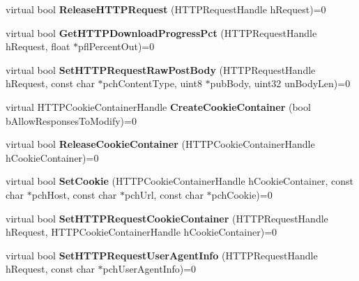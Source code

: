 \begin{DoxyCompactItemize}
\item 
\hypertarget{classISteamHTTP_ac533533e2d27065ba2f62f6e8252078a}{}virtual bool {\bfseries Release\+H\+T\+T\+P\+Request} (H\+T\+T\+P\+Request\+Handle h\+Request)=0\label{classISteamHTTP_ac533533e2d27065ba2f62f6e8252078a}

\item 
\hypertarget{classISteamHTTP_a243d9d8761e3bdbfbfc83b1d2f447800}{}virtual bool {\bfseries Get\+H\+T\+T\+P\+Download\+Progress\+Pct} (H\+T\+T\+P\+Request\+Handle h\+Request, float $\ast$pfl\+Percent\+Out)=0\label{classISteamHTTP_a243d9d8761e3bdbfbfc83b1d2f447800}

\item 
\hypertarget{classISteamHTTP_a00db00fdf21a17f5ca65019d219834a0}{}virtual bool {\bfseries Set\+H\+T\+T\+P\+Request\+Raw\+Post\+Body} (H\+T\+T\+P\+Request\+Handle h\+Request, const char $\ast$pch\+Content\+Type, uint8 $\ast$pub\+Body, uint32 un\+Body\+Len)=0\label{classISteamHTTP_a00db00fdf21a17f5ca65019d219834a0}

\item 
\hypertarget{classISteamHTTP_ac18346553863fd8c7a448ee88caff3ff}{}virtual H\+T\+T\+P\+Cookie\+Container\+Handle {\bfseries Create\+Cookie\+Container} (bool b\+Allow\+Responses\+To\+Modify)=0\label{classISteamHTTP_ac18346553863fd8c7a448ee88caff3ff}

\item 
\hypertarget{classISteamHTTP_a4fddec56eeaa93b238698a7ecb02b2a9}{}virtual bool {\bfseries Release\+Cookie\+Container} (H\+T\+T\+P\+Cookie\+Container\+Handle h\+Cookie\+Container)=0\label{classISteamHTTP_a4fddec56eeaa93b238698a7ecb02b2a9}

\item 
\hypertarget{classISteamHTTP_a98107c488259499b563febac14f1d6f5}{}virtual bool {\bfseries Set\+Cookie} (H\+T\+T\+P\+Cookie\+Container\+Handle h\+Cookie\+Container, const char $\ast$pch\+Host, const char $\ast$pch\+Url, const char $\ast$pch\+Cookie)=0\label{classISteamHTTP_a98107c488259499b563febac14f1d6f5}

\item 
\hypertarget{classISteamHTTP_a94e927f0b7f06fa79246c6443d5b3629}{}virtual bool {\bfseries Set\+H\+T\+T\+P\+Request\+Cookie\+Container} (H\+T\+T\+P\+Request\+Handle h\+Request, H\+T\+T\+P\+Cookie\+Container\+Handle h\+Cookie\+Container)=0\label{classISteamHTTP_a94e927f0b7f06fa79246c6443d5b3629}

\item 
\hypertarget{classISteamHTTP_a1e774d4620f2168ee123906d823a5646}{}virtual bool {\bfseries Set\+H\+T\+T\+P\+Request\+User\+Agent\+Info} (H\+T\+T\+P\+Request\+Handle h\+Request, const char $\ast$pch\+User\+Agent\+Info)=0\label{classISteamHTTP_a1e774d4620f2168ee123906d823a5646}


\end{DoxyCompactItemize}
